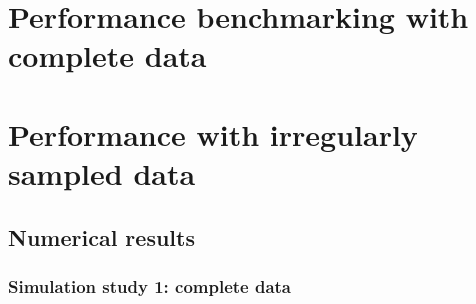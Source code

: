 \documentclass[12pt]{article}
\newcommand*\needsparaphrased{\color{red}}
\theoremstyle{definition}
\begin{document}
%

\bigskip



\section{Performance benchmarking with complete data}










\section{Performance with irregularly sampled data}






{\needsparaphrased{TODO: remember to cite the nlme package for fitting the MA(1) and CS oracle models.}}

\bigskip








\subsection{Numerical results}
\subsubsection{Simulation study 1: complete data} \label{benchmarking-results}

\setlength{\dashlinedash}{0.5pt}
\setlength{\dashlinegap}{1pt}
\setlength{\arrayrulewidth}{0.2pt}
\end{document}

